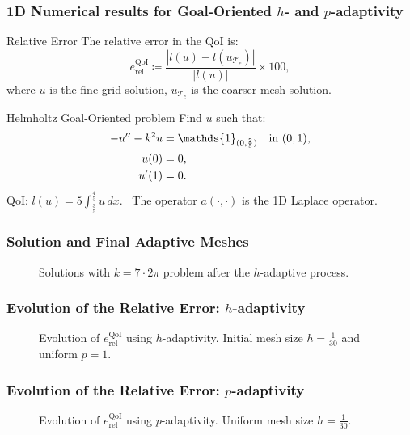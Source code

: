 \begin{frame}
  \frametitle{1D Numerical results for Goal-Oriented $h$- and $p$-adaptivity}
  \small %

  \begin{block}{Relative Error}
    The relative error in the QoI is:
    \begin{equation}
      e_{\textrm{rel}}^{\textrm{QoI}} \coloneqq \frac{|l(u) - l(u_{\mathcal{T}_{c}})|}{|l(u)|} \times 100,
    \end{equation}
    where $u$ is the fine grid solution, $u_{\mathcal{T}_{c}}$ is the coarser mesh solution.
  \end{block} 

  \begin{block}{Helmholtz Goal-Oriented problem}
    Find $u$ such that:
    \begin{align}
      \tiny %
      -u'' -k^{2}u & = \mathds{1}_{(0,\frac{2}{5})} \quad \text{in} \ (0,1), \\
      u(0)         & = 0, \\
      u'(1)        & = 0.
    \end{align}
    QoI: $l(u)= 5 \int_{\frac{3}{5}}^{\frac{4}{5}} u \, dx$. \, The operator $a\left(\cdot ,\cdot\right)$ is the 1D Laplace operator.
  \end{block}
\end{frame}

\begin{frame}
	\frametitle{Solution and Final Adaptive Meshes}
	\pgfplotsset{colormap/YlOrRd}

\begin{figure}
  \centering
  
  \caption{Solutions with $k = 7 \cdot 2 \pi$ problem after the $h$-adaptive process.}
\end{figure}
\end{frame}

\begin{frame}
	\frametitle{Evolution of the Relative Error: $h$-adaptivity}
	\begin{figure}
  	\hspace{-1cm}
	\centering
  	
  	\caption{Evolution of $e_{\textrm{rel}}^{\textrm{QoI}}$ using $h$-adaptivity. Initial mesh size $h=\frac{1}{30}$ and uniform $p=1$.}
	\end{figure}	
\end{frame}

\begin{frame}
	\frametitle{Evolution of the Relative Error: $p$-adaptivity}
	\begin{figure}
  	\centering
  	
  	\caption{Evolution of $e_{\textrm{rel}}^{\textrm{QoI}}$ using $p$-adaptivity. Uniform mesh size $h=\frac{1}{30}$.}
	\end{figure}	
\end{frame}